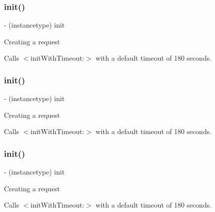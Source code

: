 \subsubsection{\texorpdfstring{init()}{init()}\hspace{0.1cm}{\footnotesize\ttfamily [3/5]}}
{\footnotesize\ttfamily -\/ (instancetype) init \begin{DoxyParamCaption}{ }\end{DoxyParamCaption}}

Creating a request

Calls $<$init\+With\+Timeout\+:$>$ with a default timeout of 180 seconds. \mbox{\label{interfaceFBRequestConnection_aaa4ab7062e1647fa4d29964052372363}} 
\subsubsection{\texorpdfstring{init()}{init()}\hspace{0.1cm}{\footnotesize\ttfamily [4/5]}}
{\footnotesize\ttfamily -\/ (instancetype) init \begin{DoxyParamCaption}{ }\end{DoxyParamCaption}}

Creating a request

Calls $<$init\+With\+Timeout\+:$>$ with a default timeout of 180 seconds. \mbox{\label{interfaceFBRequestConnection_aaa4ab7062e1647fa4d29964052372363}} 
\subsubsection{\texorpdfstring{init()}{init()}\hspace{0.1cm}{\footnotesize\ttfamily [5/5]}}
{\footnotesize\ttfamily -\/ (instancetype) init \begin{DoxyParamCaption}{ }\end{DoxyParamCaption}}

Creating a request

Calls $<$init\+With\+Timeout\+:$>$ with a default timeout of 180 seconds. \mbox{\label{interfaceFBRequestConnection_a00435ea153b22e8613108afdbabcadff}} 
